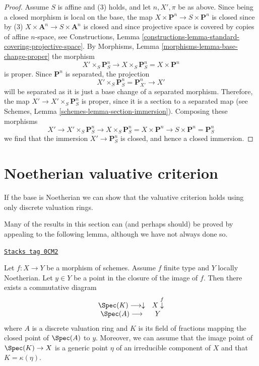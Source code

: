 \begin{proof}
\medskip\noindent
Assume $S$ is affine and (3) holds, and let $n, X', \pi$ be as above.
Since being a closed morphism is local on the base, the map
$X \times \mathbf{P}^n \to S \times \mathbf{P}^n$ is closed since by (3)
$X \times \mathbf{A}^n \to S \times \mathbf{A}^n$ is closed and since
projective space is covered by copies of affine $n$-space, see
Constructions,
Lemma \ref{constructions-lemma-standard-covering-projective-space}.
By Morphisms, Lemma \ref{morphisms-lemma-base-change-proper}
the morphism
$$
X' \times_S \mathbf{P}^n_S
\to
X \times_S \mathbf{P}^n_S =
X \times \mathbf{P}^n
$$
is proper. Since $\mathbf{P}^n$ is separated, the projection
$$
X' \times_S \mathbf{P}^n_S = \mathbf{P}^n_{X'} \to X'
$$
will be separated as it is just a base change of a separated
morphism. Therefore, the map $X' \to X' \times_S \mathbf{P}^n_S$ is proper,
since it is a section to a separated map (see
Schemes, Lemma \ref{schemes-lemma-section-immersion}).
Composing these morphisms
$$
X' \to X' \times_S \mathbf{P}^n_S \to X \times_S \mathbf{P}^n_S
= X \times \mathbf{P}^n \to S \times \mathbf{P}^n = \mathbf{P}^n_S
$$
we find that the immersion $X' \to \mathbf{P}^n_S$ is closed, and
hence a closed immersion.
\end{proof}

\section{Noetherian valuative criterion}
\label{limits-section-Noetherian-valuative-criterion}
If the base is Noetherian we can show that the valuative criterion holds
using only discrete valuation rings.

\medskip\noindent
Many of the results in this section can (and perhaps should)
be proved by appealing to the following lemma, although we have not
always done so.

\begin{lemma}
\label{limits-lemma-reach-point-closure-Noetherian}
\href{https://stacks.math.columbia.edu/tag/0CM2}{\texttt{Stacks tag 0CM2}}

Let $f : X \to Y$ be a morphism of schemes.
Assume $f$ finite type and $Y$ locally Noetherian.
Let $y \in Y$ be a point in the closure of the image of $f$.
Then there exists a commutative diagram
$$
\begin{array}{cc}\Spec(K) \longrightarrow\downarrow & X \overset{f}{\downarrow} \\ \Spec(A) \longrightarrow & Y\end{array}
$$
where $A$ is a discrete valuation ring and $K$ is its field of fractions
mapping the closed point of $\Spec(A)$ to $y$. Moreover, we can assume
that the image point of $\Spec(K) \to X$ is a generic point $\eta$
of an irreducible component of $X$ and that $K = \kappa(\eta)$.
\end{lemma}

